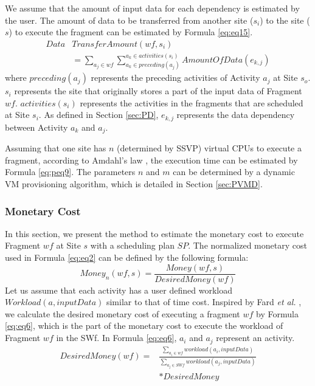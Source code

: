 We assume that the amount of input data for each dependency is estimated by the user. 
The amount of data to be transferred from another site ($s_i$) to the site ($s$) to execute the fragment can be estimated by Formula \ref{eq:eq15}. 
\begin{equation}\label{eq:eq15}
\begin{split}
Data&TransferAmount( wf, s_i ) \\&= \sum_{a_j\in wf}\sum_{a_k\in preceding(a_j)}^ {a_k \in activities(s_i)}AmountOfData(e_{k,j})
\end{split}
\end{equation}
where $preceding(a_j)$ represents the preceding activities of Activity $a_j$ at Site $s_o$. $s_i$ represents the site that originally stores a part of the input data of Fragment $wf$. $activities(s_i)$ represents the activities in the fragments that are scheduled at Site $s_i$. As defined in Section \ref{sec:PD}, $e_{k,j}$ represents the data dependency between Activity $a_k$ and $a_j$.

Assuming that one site has $n$ (determined by SSVP) virtual CPUs to execute a fragment, according to Amdahl's law \cite{Sun2013}, the execution time can be estimated by Formula \ref{eq:peq9}.
The parameters $n$ and $m$ can be determined by a dynamic VM provisioning algorithm, which is detailed in Section \ref{sec:PVMD}.

\subsubsection{Monetary Cost}
\label{subsubsec:MC}

In this section, we present the method to estimate the monetary cost to execute Fragment $wf$ at Site $s$ with a scheduling plan $SP$. The normalized monetary cost used in Formula \ref{eq:eq2} can be defined by the following formula:
\begin{equation}\label{eq:eq4}
\boxed{
Money_n( wf,s ) = \frac{Money( wf,s )}{DesiredMoney(wf)}
}
\end{equation}
Let us assume that each activity has a user defined workload $Workload(a, inputData)$ similar to that of time cost. Inspired by Fard \textit{et al.} \cite{Fard2014}, we calculate the desired monetary cost of executing a fragment $wf$ by Formula \ref{eq:eq6}, which is the part of the monetary cost to execute the workload of Fragment $wf$ in the SWf. In Formula \ref{eq:eq6}, $a_i$ and $a_j$ represent an activity.
\begin{equation}\label{eq:eq6}
\boxed{
\begin{split}
DesiredMoney( wf ) = &\frac{\sum_{a_i \in wf}workload(a_i, inputData)}{\sum_{a_j \in SWf}workload(a_j, inputData)} \\&* DesiredMoney
\end{split}
}
\end{equation}

